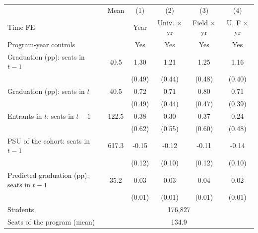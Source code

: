 \begin{tabular}{lccccc}
\toprule
 & Mean & (1) & (2) & (3) & (4) \\
Time FE & & Year & Univ. \(\times\) yr & Field \(\times\) yr & U, F \(\times\) yr \\
Program-year controls & & Yes & Yes & Yes & Yes \\
\midrule
 Graduation (pp): seats in \(t-1\) &  40.5 &   1.30\sym{***} &   1.21\sym{***} &   1.25\sym{***} &   1.16\sym{***} \\
 & & (0.49) & (0.44) & (0.48) & (0.40) \\
 Graduation (pp): seats in \(t\) &  40.5 &   0.72 &   0.71 &   0.80\sym{*} &   0.71\sym{*} \\
 & & (0.49) & (0.44) & (0.47) & (0.39) \\
\addlinespace
 Entrants in \(t\): seats in \(t-1\) & 122.5 &   0.38 &   0.30 &   0.37 &   0.24 \\
 & & (0.62) & (0.55) & (0.60) & (0.48) \\
 PSU of the cohort: seats in \(t-1\) & 617.3 &  -0.15 &  -0.12 &  -0.11 &  -0.14 \\
 & & (0.12) & (0.10) & (0.12) & (0.10) \\
 Predicted graduation (pp): seats in \(t-1\) &  35.2 &   0.03\sym{**} &   0.03\sym{*} &   0.04\sym{***} &   0.02\sym{*} \\
 & & (0.01) & (0.01) & (0.01) & (0.01) \\
\midrule
Students & \multicolumn{5}{c}{  176,827} \\
Seats of the program (mean) & \multicolumn{5}{c}{134.9} \\
\bottomrule
\end{tabular}
